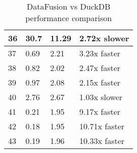 \begin{table}[h]
\begin{tabular}{|l|l|l|l|}
\hline
36 & 30.7 & 11.29 & 2.72x slower \\
\hline
37 & 0.69 & 2.21 & 3.23x faster \\
\hline
38 & 0.82 & 2.02 & 2.47x faster \\
\hline
39 & 0.97 & 2.08 & 2.15x faster \\
\hline
40 & 2.76 & 2.67 & 1.03x slower \\
\hline
41 & 0.21 & 1.95 & 9.17x faster \\
\hline
42 & 0.18 & 1.95 & 10.71x faster \\
\hline
43 & 0.19 & 1.96 & 10.33x faster \\
\hline
\end{tabular}
\caption{DataFusion vs DuckDB performance comparison}
\label{table:1}
\end{table}